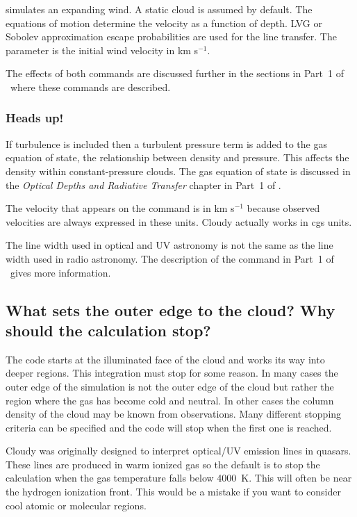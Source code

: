 \documentclass[12pt,twoside]{article}
\begin{document}
 simulates an expanding wind.
A static cloud is assumed by default.
The equations of motion determine the velocity as a function of depth.
LVG or Sobolev approximation escape probabilities are used for the line
transfer.  The parameter is the initial wind velocity in km s$^{-1}$.

The effects of both commands are discussed further in the sections in
Part~1 of \Hazy\ where these commands are described.

\subsubsection{Heads up!}

If turbulence is included then a turbulent pressure term is added to
the gas equation of state, the relationship between density and pressure.
This affects the density within constant-pressure clouds.  The gas equation
of state is discussed in the \emph{Optical Depths and Radiative Transfer}
chapter in Part~1 of \Hazy.

The velocity that appears on the 
command is in km s$^{-1}$ because
observed velocities are always expressed in these units. Cloudy actually
works in cgs units.

The line width used in optical and UV astronomy is not the same as the
line width used in radio astronomy.
The description of the  command in Part~1 of
\Hazy\ gives more information.

\subsection{What sets the outer edge to the cloud?
Why should the calculation stop?}
\label{sec:StoppingCriteria}

The code starts at the illuminated face of the cloud and works its way
into deeper regions.
This integration must stop for some reason.
In many
cases the outer edge of the simulation is not the outer edge of the cloud
but rather the region where the gas has become cold and neutral.  In other
cases the column density of the cloud may be known from observations.  Many
different stopping criteria can be specified and the code will stop when
the first one is reached.

Cloudy was originally designed to interpret optical/UV emission lines
in quasars.  These lines are produced in warm ionized gas so the default
is to stop the calculation when the gas temperature falls below 4000~K.
This will often be near the hydrogen ionization front.  This would be a
mistake if you want to consider cool atomic or molecular regions.
\end{document}
